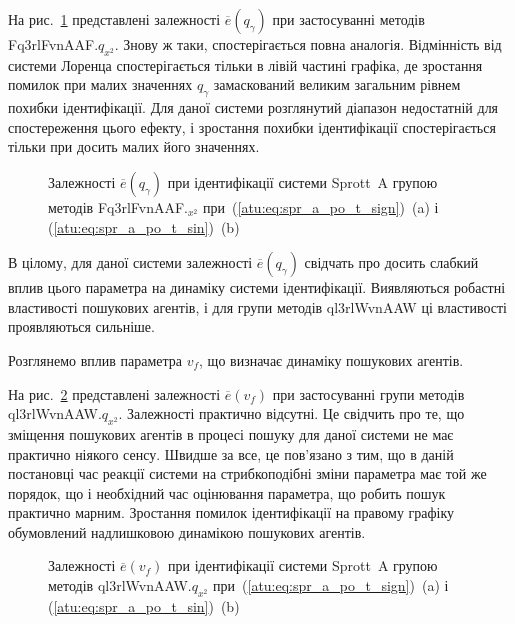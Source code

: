 На рис.~\ref{atu:f:spr_a_qg_Fq3rlFvnAAF_q_x2} представлені залежності
$\overline{e} (q_\gamma)$ при застосуванні методів Fq3rlFvnAAF.$q_{x^2}$.
Знову ж таки, спостерігається повна
аналогія. Відмінність від системи Лоренца спостерігається
тільки в лівій частині графіка, де зростання помилок при малих
значеннях
$q_\gamma$ замаскований великим загальним рівнем похибки
ідентифікації. Для даної системи розглянутий діапазон
недостатній для спостереження цього ефекту, і зростання похибки
ідентифікації спостерігається тільки при досить малих його
значеннях.

\begin{figure}[htb!]
  \caption{Залежності $\overline{e} (q_\gamma)$ при ідентифікації системи Sprott~A групою методів Fq3rlFvnAAF.$_{x^2}$ при~(\ref{atu:eq:spr_a_po_t_sign})~(a) і (\ref{atu:eq:spr_a_po_t_sin})~(b)}
  \label{atu:f:spr_a_qg_Fq3rlFvnAAF_q_x2}
\end{figure}

В цілому, для даної системи залежності
$\overline{e}(q_\gamma)$ свідчать про досить слабкий вплив цього
параметра на динаміку системи ідентифікації. Виявляються
робастні властивості пошукових агентів, і для групи методів
ql3rlWvnAAW ці властивості проявляються сильніше.


Розглянемо вплив параметра
$v_f$, що визначає динаміку пошукових агентів.

На рис.~\ref{atu:f:spr_a_v_f_ql3rlWvnAAW_q_x2} представлені залежності
$\overline{e} (v_f)$ при застосуванні групи методів ql3rlWvnAAW.$q_{x^2}$.
Залежності практично відсутні. Це свідчить про те, що зміщення
пошукових агентів в процесі пошуку для даної системи не має
практично ніякого сенсу. Швидше за все, це пов'язано з тим, що в
даній постановці час реакції системи на стрибкоподібні зміни
параметра має той же порядок, що і необхідний час оцінювання
параметра, що робить пошук практично марним. Зростання помилок
ідентифікації на правому графіку обумовлений надлишковою
динамікою пошукових агентів.



\begin{figure}[htb!]
  \caption{Залежності $\overline{e}(v_f)$ при ідентифікації системи Sprott~A групою методів ql3rlWvnAAW.$q_{x^2}$ при~(\ref{atu:eq:spr_a_po_t_sign})~(a) і (\ref{atu:eq:spr_a_po_t_sin})~(b)}
  \label{atu:f:spr_a_v_f_ql3rlWvnAAW_q_x2}
\end{figure}

